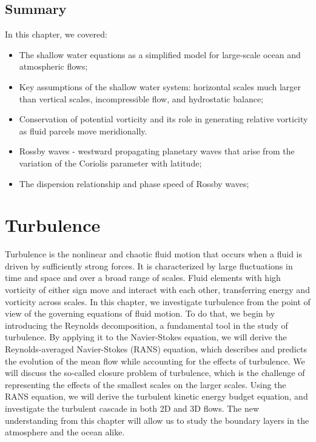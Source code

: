 \documentclass[12pt]{article}
\numberwithin{equation}{section}
\numberwithin{figure}{section}
\numberwithin{table}{section}
\begin{document}
\subsection*{Summary}

In this chapter, we covered:

\begin{itemize}
  \item The shallow water equations as a simplified model for large-scale ocean and atmospheric flows;
  \item Key assumptions of the shallow water system: horizontal scales much larger than vertical scales, incompressible flow, and hydrostatic balance;
  \item Conservation of potential vorticity and its role in generating relative vorticity as fluid parcels move meridionally.
  \item Rossby waves - westward propagating planetary waves that arise from the variation of the Coriolis parameter with latitude;
  \item The dispersion relationship and phase speed of Rossby waves;
\end{itemize}

\newpage
\section{Turbulence}
\label{sec:turbulence}

Turbulence is the nonlinear and chaotic fluid motion that occurs when a fluid
is driven by sufficiently strong forces.
It is characterized by large fluctuations in time and space and over a broad
range of scales.
Fluid elements with high vorticity of either sign move and interact with each
other, transferring energy and vorticity across scales.
In this chapter, we investigate turbulence from the point of view of the
governing equations of fluid motion.
To do that, we begin by introducing the Reynolds decomposition, a fundamental
tool in the study of turbulence.
By applying it to the Navier-Stokes equation, we will derive the Reynolds-averaged
Navier-Stokes (RANS) equation, which describes and predicts the evolution of the
mean flow while accounting for the effects of turbulence.
We will discuss the so-called closure problem of turbulence, which is the
challenge of representing the effects of the smallest scales on the larger scales.
Using the RANS equation, we will derive the turbulent kinetic energy budget
equation, and investigate the turbulent cascade in both 2D and 3D flows.
The new understanding from this chapter will allow us to study the boundary
layers in the atmosphere and the ocean alike.
\end{document}
